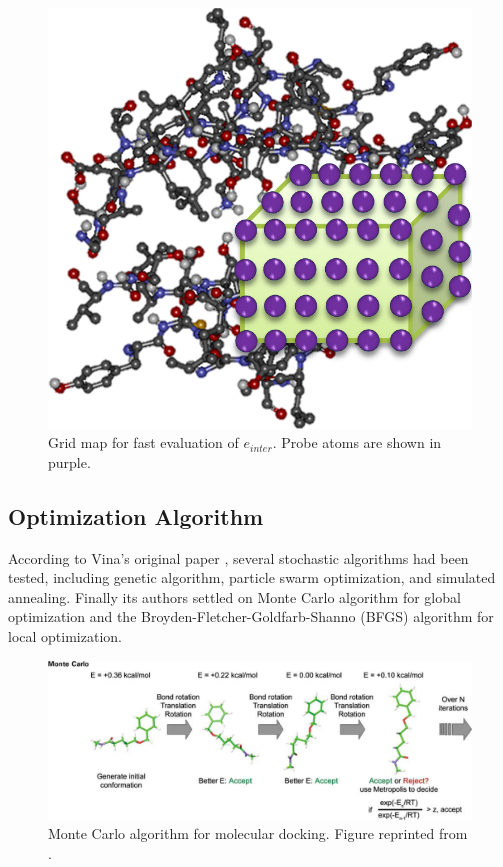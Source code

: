 \begin{figure}[h!]
\centering
\includegraphics[width=\textwidth]{VirtualScreening/Figures/GridMap.png}
\caption{Grid map for fast evaluation of $e_{inter}$. Probe atoms are shown in purple.}
\label{fig:GridMap}
\end{figure}

\subsection{Optimization Algorithm}

According to Vina's original paper \citep{595-2010}, several stochastic algorithms had been tested, including genetic algorithm, particle swarm optimization, and simulated annealing. Finally its authors settled on Monte Carlo algorithm for global optimization and the Broyden-Fletcher-Goldfarb-Shanno (BFGS) \citep{786-2006} algorithm for local optimization.

\begin{figure}
\centering
\includegraphics[width=\textwidth]{VirtualScreening/Figures/MonteCarlo.png}
\caption{Monte Carlo algorithm for molecular docking. Figure reprinted from \citep{493-2008}.}
\label{fig:DockingByMonteCarlo}
\end{figure}

